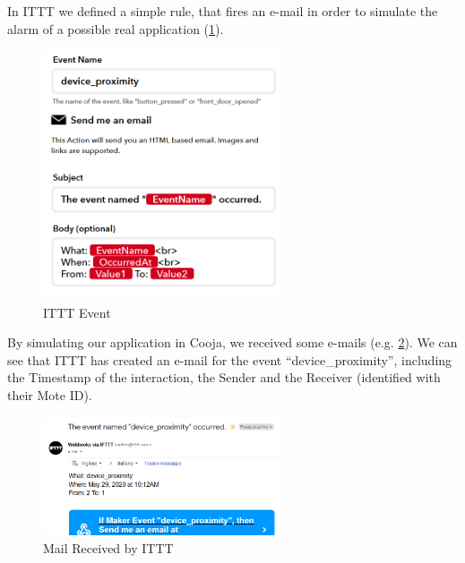 \documentclass[12pt]{article}
\begin{document}
In ITTT we defined a simple rule, that fires an e-mail in order to simulate the alarm of a possible real application (\ref{fig:ittt-event}). 

\begin{figure}[h]
	\centering
	\captionsetup{justification=centering}
	\includegraphics[width=200pt]{ittt-event.png}	
	\caption{ITTT Event}
	\label{fig:ittt-event}
\end{figure}

By simulating our application in Cooja, we received some e-mails (e.g. \ref{fig:mail}). We can see that ITTT has created an e-mail for the event ``device\_proximity'', including the Timestamp of the interaction, the Sender and the Receiver (identified with their Mote ID).


\begin{figure}[h]
	\centering
	\captionsetup{justification=centering}
	\includegraphics[width=200pt]{mail.png}	
	\caption{Mail Received by ITTT}
	\label{fig:mail}
\end{figure}
\end{document}
